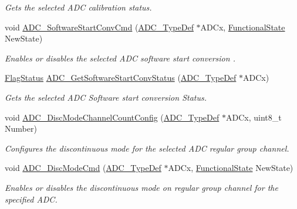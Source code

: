 \begin{DoxyCompactItemize}
\begin{DoxyCompactList}\small\item\em Gets the selected A\+DC calibration status. \end{DoxyCompactList}\item 
void \hyperlink{group___a_d_c___exported___functions_ga694130a8d1ad3c8877b7eddb29611b30}{A\+D\+C\+\_\+\+Software\+Start\+Conv\+Cmd} (\hyperlink{struct_a_d_c___type_def}{A\+D\+C\+\_\+\+Type\+Def} $\ast$A\+D\+Cx, \hyperlink{group___exported__types_gac9a7e9a35d2513ec15c3b537aaa4fba1}{Functional\+State} New\+State)
\begin{DoxyCompactList}\small\item\em Enables or disables the selected A\+DC software start conversion . \end{DoxyCompactList}\item 
\hyperlink{group___exported__types_ga89136caac2e14c55151f527ac02daaff}{Flag\+Status} \hyperlink{group___a_d_c___exported___functions_gaf1119583782ecbcec380efcb7eb74883}{A\+D\+C\+\_\+\+Get\+Software\+Start\+Conv\+Status} (\hyperlink{struct_a_d_c___type_def}{A\+D\+C\+\_\+\+Type\+Def} $\ast$A\+D\+Cx)
\begin{DoxyCompactList}\small\item\em Gets the selected A\+DC Software start conversion Status. \end{DoxyCompactList}\item 
void \hyperlink{group___a_d_c___exported___functions_ga6eb241ba82d67d1371136c9132083937}{A\+D\+C\+\_\+\+Disc\+Mode\+Channel\+Count\+Config} (\hyperlink{struct_a_d_c___type_def}{A\+D\+C\+\_\+\+Type\+Def} $\ast$A\+D\+Cx, uint8\+\_\+t Number)
\begin{DoxyCompactList}\small\item\em Configures the discontinuous mode for the selected A\+DC regular group channel. \end{DoxyCompactList}\item 
void \hyperlink{group___a_d_c___exported___functions_ga1909649d10253ce88d986ffbb94a4be6}{A\+D\+C\+\_\+\+Disc\+Mode\+Cmd} (\hyperlink{struct_a_d_c___type_def}{A\+D\+C\+\_\+\+Type\+Def} $\ast$A\+D\+Cx, \hyperlink{group___exported__types_gac9a7e9a35d2513ec15c3b537aaa4fba1}{Functional\+State} New\+State)
\begin{DoxyCompactList}\small\item\em Enables or disables the discontinuous mode on regular group channel for the specified A\+DC. \end{DoxyCompactList}\item 

\end{DoxyCompactItemize}
